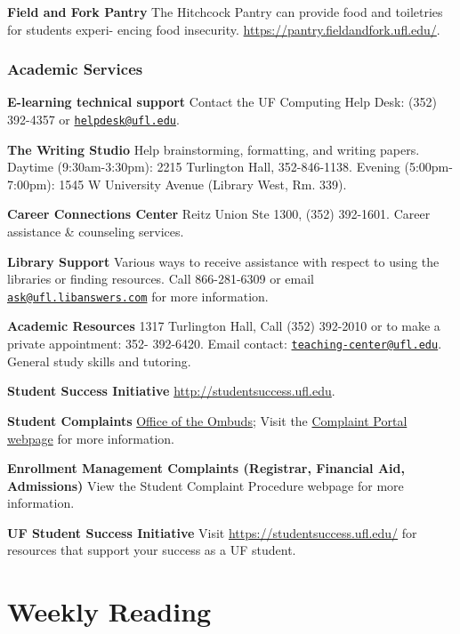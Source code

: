 \documentclass[
  10pt,
  letterpaper,
  oneside,
  open=any]{scrbook}
\begin{document}
\textbf{Field and Fork Pantry} The Hitchcock Pantry can provide food and
toiletries for students experi- encing food insecurity.
\url{https://pantry.fieldandfork.ufl.edu/}.

\subsection*{Academic Services}\label{academic-services}

\vspace{0.3cm}

\textbf{E-learning technical support} Contact the UF Computing Help
Desk: (352) 392-4357 or
\href{mailto:helpdesk@ufl.edu}{\nolinkurl{helpdesk@ufl.edu}}.

\textbf{The Writing Studio} Help brainstorming, formatting, and writing
papers. Daytime (9:30am-3:30pm): 2215 Turlington Hall, 352-846-1138.
Evening (5:00pm-7:00pm): 1545 W University Avenue (Library West, Rm.
339).

\textbf{Career Connections Center} Reitz Union Ste 1300, (352) 392-1601.
Career assistance \& counseling services.

\textbf{Library Support} Various ways to receive assistance with respect
to using the libraries or finding resources. Call 866-281-6309 or email
\href{mailto:ask@ufl.libanswers.com}{\nolinkurl{ask@ufl.libanswers.com}}
for more information.

\textbf{Academic Resources} 1317 Turlington Hall, Call (352) 392-2010 or
to make a private appointment: 352- 392-6420. Email contact:
\href{mailto:teaching-center@ufl.edu}{\nolinkurl{teaching-center@ufl.edu}}.
General study skills and tutoring.

\textbf{Student Success Initiative} \url{http://studentsuccess.ufl.edu}.

\textbf{Student Complaints} \href{https://ombuds.ufl.edu/}{Office of the
Ombuds}; Visit the
\href{https://ombuds.ufl.edu/complaint-portal/}{Complaint Portal
webpage} for more information.

\textbf{Enrollment Management Complaints (Registrar, Financial Aid,
Admissions)} View the Student Complaint Procedure webpage for more
information.

\textbf{UF Student Success Initiative} Visit
\url{https://studentsuccess.ufl.edu/} for resources that support your
success as a UF student.


\chapter{Weekly Reading}\label{weekly-reading}
\end{document}
